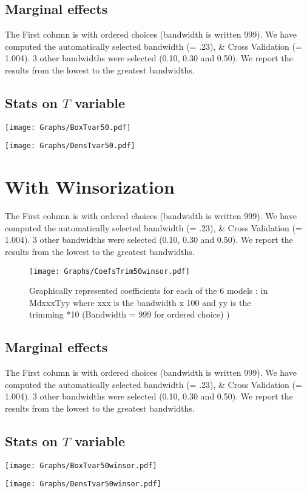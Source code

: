 \documentclass[a4paper]{article}
\begin{document}
\subsection{Marginal effects}

The First column is with ordered choices (bandwidth is written 999). We  have computed the  automatically selected bandwidth  (= .23), \& Cross Validation (= 1.004). 3 other  bandwidths were selected (0.10, 0.30 and 0.50). We report the results from the lowest to the greatest bandwidths. \\
\newpage
\subsection{Stats on $T$ variable}



\texttt{[image: Graphs/BoxTvar50.pdf]}


\texttt{[image: Graphs/DensTvar50.pdf]}

\section{With Winsorization}
The First column is with ordered choices (bandwidth is written 999). We  have computed the  automatically selected bandwidth  (= .23), \& Cross Validation (= 1.004). 3 other  bandwidths were selected (0.10, 0.30 and 0.50). We report the results from the lowest to the greatest bandwidths. \\



\newpage

\begin{sidewaysfigure}[h!]
\caption{Graphically represented coefficients for each of the 6 models : in MdxxxTyy  where xxx is the bandwidth x 100 and yy is the trimming *10 (Bandwidth = 999 for ordered choice) )}\label{PlotFOK}
\texttt{[image: Graphs/CoefsTrim50winsor.pdf]}

\end{sidewaysfigure}
\clearpage

\subsection{Marginal effects}

The First column is with ordered choices (bandwidth is written 999). We  have computed the  automatically selected bandwidth  (= .23), \& Cross Validation (= 1.004). 3 other  bandwidths were selected (0.10, 0.30 and 0.50). We report the results from the lowest to the greatest bandwidths. \\
\newpage
\subsection{Stats on $T$ variable}



\texttt{[image: Graphs/BoxTvar50winsor.pdf]}


\texttt{[image: Graphs/DensTvar50winsor.pdf]}
\end{document}
